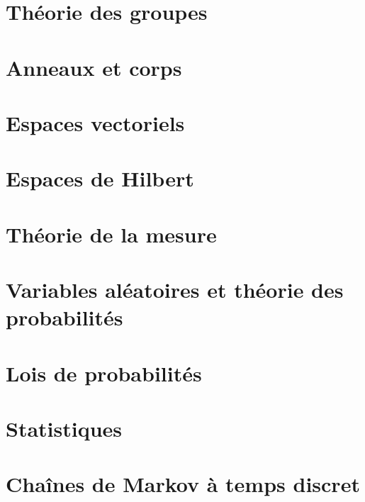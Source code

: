 


\makeindex
\makenomenclature





    
    

\tableofcontents

\chapter{Théorie des groupes}


\chapter{Anneaux et corps}


\chapter{Espaces vectoriels}


\chapter{Espaces de Hilbert}


\chapter{Théorie de la mesure}


\chapter{Variables aléatoires et théorie des probabilités}


\chapter{Lois de probabilités}


\chapter{Statistiques}


\chapter{Chaînes de Markov à temps discret}


